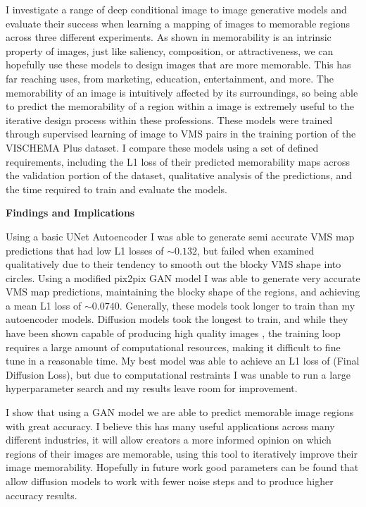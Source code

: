 \documentclass{UoYCSproject}
\begin{document}
I investigate a range of deep conditional image to image generative models and evaluate their success when learning a mapping of images to memorable regions across three different experiments. 
As shown in \cite{Isola2011,IsolaParikhTorralbaOliva2011}
memorability is an intrinsic property of images, just like saliency, composition, or attractiveness, we can hopefully use these models to design images that are more memorable. This has far reaching uses, from marketing, education, entertainment, and more. The memorability of an image is intuitively affected by its surroundings, so being able to predict the memorability of a region within a image is extremely useful to the iterative design process within these professions.  
These models were trained through supervised learning of image to VMS pairs in the training portion of the VISCHEMA Plus dataset. I compare these models using a set of defined requirements, including the L1 loss of their predicted memorability maps across the validation portion of the dataset, qualitative analysis of the predictions, and the time required to train and evaluate the models.

\textbf{Findings and Implications}

Using a basic UNet Autoencoder I was able to generate semi accurate VMS map predictions that had low L1 losses of \(\sim 0.132\), but failed when examined qualitatively due to their tendency to smooth out the blocky VMS shape into circles.
Using a modified pix2pix GAN model \cite{isola2018imagetoimage} I was able to generate very accurate VMS map predictions, maintaining the blocky shape of the regions, and achieving a mean L1 loss of \(\sim 0.0740\). Generally, these models took longer to train than my autoencoder models.
Diffusion models took the longest to train, and while they have been shown capable of producing high quality images \cite{ramesh2022hierarchical, saharia2022photorealistic}, the training loop requires a large amount of computational resources, making it difficult to fine tune in a reasonable time. My best model was able to achieve an L1 loss of (Final Diffusion Loss), but due to computational restraints I was unable to run a large hyperparameter search and my results leave room for improvement.

I show that using a GAN model we are able to predict memorable image regions with great accuracy. I believe this has many useful applications across many different industries, it will allow creators a more informed opinion on which regions of their images are memorable, using this tool to iteratively improve their image memorability. Hopefully in future work good parameters can be found that allow diffusion models to work with fewer noise steps and to produce higher accuracy results.
\end{document}
